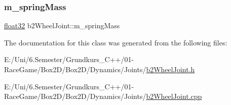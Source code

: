 \mbox{\label{classb2_wheel_joint_ab24b6e3ad48961de7d78e4476531dd30}} 
\subsubsection{\texorpdfstring{m\_springMass}{m\_springMass}}
{\footnotesize\ttfamily \mbox{\hyperlink{b2_settings_8h_aacdc525d6f7bddb3ae95d5c311bd06a1}{float32}} b2\+Wheel\+Joint\+::m\+\_\+spring\+Mass\hspace{0.3cm}{\ttfamily [protected]}}



The documentation for this class was generated from the following files\+:\begin{DoxyCompactItemize}
\item 
E\+:/\+Uni/6.\+Semester/\+Grundkurs\+\_\+\+C++/01-\/\+Race\+Game/\+Box2\+D/\+Box2\+D/\+Dynamics/\+Joints/\mbox{\hyperlink{b2_wheel_joint_8h}{b2\+Wheel\+Joint.\+h}}\item 
E\+:/\+Uni/6.\+Semester/\+Grundkurs\+\_\+\+C++/01-\/\+Race\+Game/\+Box2\+D/\+Box2\+D/\+Dynamics/\+Joints/\mbox{\hyperlink{b2_wheel_joint_8cpp}{b2\+Wheel\+Joint.\+cpp}}\end{DoxyCompactItemize}
